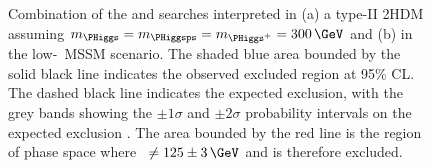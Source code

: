 \begin{figure}[h!]
\begin{center}
\caption[Combination of the \AtoZhtolltautau and \Htohhtobbtautau searches
interpreted in a type-II 2HDM and in the low-\tanb~MSSM scenario.]{Combination of the \AtoZhtolltautau and \Htohhtobbtautau searches
interpreted in (a) a type-II \ac{2HDM} assuming $m_{\PHiggs} = m_{\PHiggsps} = m_{\PHiggs^{+}} = 300\,\GeV$ and 
(b) in the low-\tanb~MSSM scenario. The shaded blue area bounded by
the solid black line indicates the observed excluded region at 95\% \ac{CL}.
The dashed black line indicates the expected exclusion, with the grey bands showing
the $\pm 1\sigma$ and $\pm2\sigma$ probability intervals on the expected exclusion \cite{CMS-HIG-14-034}. The area
bounded by the red line is the region of phase space where \mh~$\neq 125 \pm 3\,\GeV$
 and is therefore excluded.}
\label{fig:HhhAZhMSSM2HDM}
\end{center}
\end{figure}
